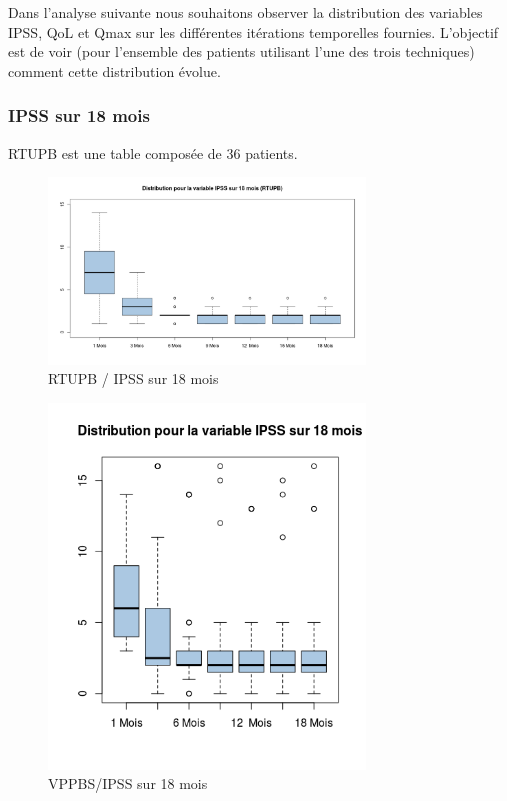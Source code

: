%
%

Dans l'analyse suivante nous souhaitons observer la distribution des variables IPSS, QoL et Qmax sur les différentes itérations temporelles fournies. L'objectif est de voir (pour l'ensemble des patients utilisant l'une des trois techniques) comment cette distribution évolue. 

\subsubsection{IPSS sur 18 mois }

RTUPB est une table composée de 36 patients. 
	
\begin{figure}[H]
\centering
\includegraphics[width=0.75\textwidth]{../Fig/RTUPB/rtupb-boxplot-post-ipss}
\caption{RTUPB / IPSS sur 18 mois}
\end{figure}	
	
\begin{figure}[H]
\centering
\includegraphics[width=0.75\textwidth]{../Fig/VPPBS/vppbs-boxplot-post-ipss}
\caption{VPPBS/IPSS sur 18 mois}
\end{figure}


